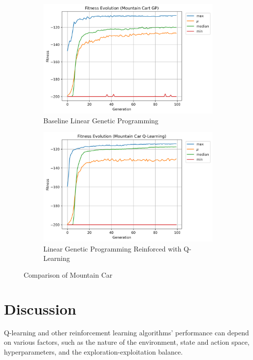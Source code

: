 \documentclass[12pt, final]{dalcsthesis}
\begin{document}
\begin{figure}[ht]
	\centering
	\begin{subfigure}{1.0\textwidth}
		\includegraphics[width=\linewidth]{mountain_car_lgp.png}
		\caption{Baseline Linear Genetic Programming}
		\label{fig:mountain-car-lgp}
	\end{subfigure}
	\hfill
	\begin{subfigure}{1.0\textwidth}
		\includegraphics[width=\linewidth]{mountain_car_q.png}
		\caption{Linear Genetic Programming Reinforced with Q-Learning}
		\label{fig:mountain-car-q}
	\end{subfigure}
	\caption{Comparison of Mountain Car}
	\label{fig:mountain-car-comparison}
\end{figure}


\section{Discussion}
Q-learning and other reinforcement learning algorithms' performance can depend on various factors, such as the nature of the environment, state and action space, hyperparameters, and the exploration-exploitation balance.
\end{document}
